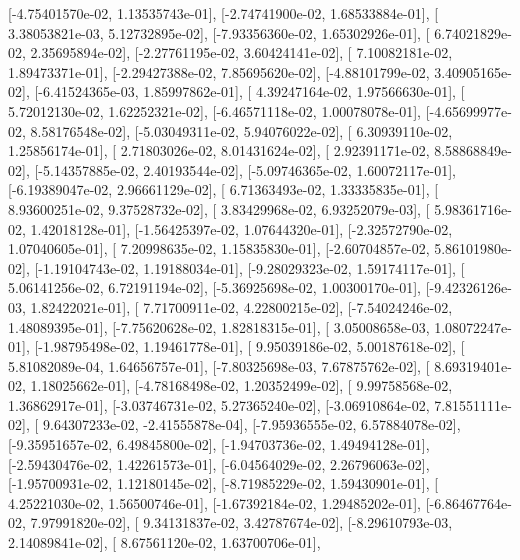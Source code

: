 \documentclass{article}
\begin{document}
       [-4.75401570e-02,  1.13535743e-01],
       [-2.74741900e-02,  1.68533884e-01],
       [ 3.38053821e-03,  5.12732895e-02],
       [-7.93356360e-02,  1.65302926e-01],
       [ 6.74021829e-02,  2.35695894e-02],
       [-2.27761195e-02,  3.60424141e-02],
       [ 7.10082181e-02,  1.89473371e-01],
       [-2.29427388e-02,  7.85695620e-02],
       [-4.88101799e-02,  3.40905165e-02],
       [-6.41524365e-03,  1.85997862e-01],
       [ 4.39247164e-02,  1.97566630e-01],
       [ 5.72012130e-02,  1.62252321e-02],
       [-6.46571118e-02,  1.00078078e-01],
       [-4.65699977e-02,  8.58176548e-02],
       [-5.03049311e-02,  5.94076022e-02],
       [ 6.30939110e-02,  1.25856174e-01],
       [ 2.71803026e-02,  8.01431624e-02],
       [ 2.92391171e-02,  8.58868849e-02],
       [-5.14357885e-02,  2.40193544e-02],
       [-5.09746365e-02,  1.60072117e-01],
       [-6.19389047e-02,  2.96661129e-02],
       [ 6.71363493e-02,  1.33335835e-01],
       [ 8.93600251e-02,  9.37528732e-02],
       [ 3.83429968e-02,  6.93252079e-03],
       [ 5.98361716e-02,  1.42018128e-01],
       [-1.56425397e-02,  1.07644320e-01],
       [-2.32572790e-02,  1.07040605e-01],
       [ 7.20998635e-02,  1.15835830e-01],
       [-2.60704857e-02,  5.86101980e-02],
       [-1.19104743e-02,  1.19188034e-01],
       [-9.28029323e-02,  1.59174117e-01],
       [ 5.06141256e-02,  6.72191194e-02],
       [-5.36925698e-02,  1.00300170e-01],
       [-9.42326126e-03,  1.82422021e-01],
       [ 7.71700911e-02,  4.22800215e-02],
       [-7.54024246e-02,  1.48089395e-01],
       [-7.75620628e-02,  1.82818315e-01],
       [ 3.05008658e-03,  1.08072247e-01],
       [-1.98795498e-02,  1.19461778e-01],
       [ 9.95039186e-02,  5.00187618e-02],
       [ 5.81082089e-04,  1.64656757e-01],
       [-7.80325698e-03,  7.67875762e-02],
       [ 8.69319401e-02,  1.18025662e-01],
       [-4.78168498e-02,  1.20352499e-02],
       [ 9.99758568e-02,  1.36862917e-01],
       [-3.03746731e-02,  5.27365240e-02],
       [-3.06910864e-02,  7.81551111e-02],
       [ 9.64307233e-02, -2.41555878e-04],
       [-7.95936555e-02,  6.57884078e-02],
       [-9.35951657e-02,  6.49845800e-02],
       [-1.94703736e-02,  1.49494128e-01],
       [-2.59430476e-02,  1.42261573e-01],
       [-6.04564029e-02,  2.26796063e-02],
       [-1.95700931e-02,  1.12180145e-02],
       [-8.71985229e-02,  1.59430901e-01],
       [ 4.25221030e-02,  1.56500746e-01],
       [-1.67392184e-02,  1.29485202e-01],
       [-6.86467764e-02,  7.97991820e-02],
       [ 9.34131837e-02,  3.42787674e-02],
       [-8.29610793e-03,  2.14089841e-02],
       [ 8.67561120e-02,  1.63700706e-01],
\end{document}
